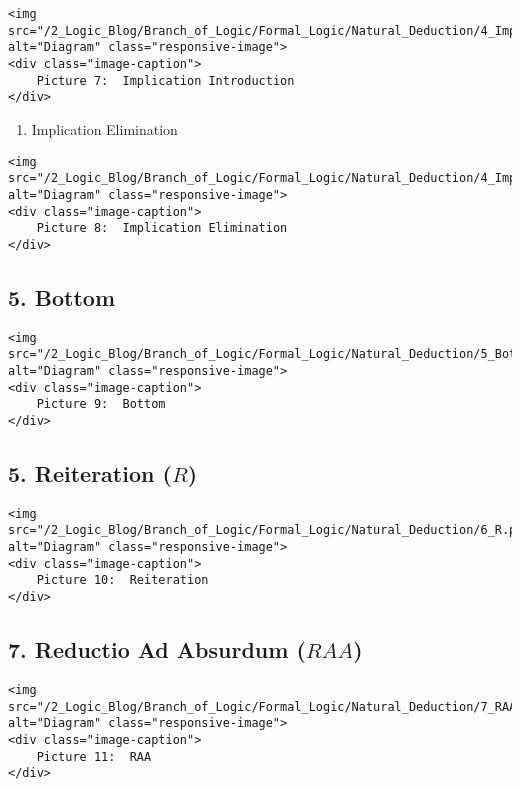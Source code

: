 \begin{verbatim}
<img src="/2_Logic_Blog/Branch_of_Logic/Formal_Logic/Natural_Deduction/4_Imp_Intro.png" alt="Diagram" class="responsive-image">
<div class="image-caption">
    Picture 7:  Implication Introduction
</div>
\end{verbatim}

\begin{enumerate}
\def\labelenumi{\alph{enumi}.}
\setcounter{enumi}{1}
\tightlist
\item
  Implication Elimination
\end{enumerate}

\begin{verbatim}
<img src="/2_Logic_Blog/Branch_of_Logic/Formal_Logic/Natural_Deduction/4_Imp_Elim.png" alt="Diagram" class="responsive-image">
<div class="image-caption">
    Picture 8:  Implication Elimination
</div>
\end{verbatim}

\subsection{5. Bottom}\label{bottom}

\begin{verbatim}
<img src="/2_Logic_Blog/Branch_of_Logic/Formal_Logic/Natural_Deduction/5_Bot.png" alt="Diagram" class="responsive-image">
<div class="image-caption">
    Picture 9:  Bottom
</div>
\end{verbatim}

\subsection{\texorpdfstring{5. Reiteration
(\(R\))}{5. Reiteration (R)}}\label{reiteration-r}

\begin{verbatim}
<img src="/2_Logic_Blog/Branch_of_Logic/Formal_Logic/Natural_Deduction/6_R.png" alt="Diagram" class="responsive-image">
<div class="image-caption">
    Picture 10:  Reiteration
</div>
\end{verbatim}

\subsection{\texorpdfstring{7. Reductio Ad Absurdum
(\(RAA\))}{7. Reductio Ad Absurdum (RAA)}}\label{reductio-ad-absurdum-raa}

\begin{verbatim}
<img src="/2_Logic_Blog/Branch_of_Logic/Formal_Logic/Natural_Deduction/7_RAA.png" alt="Diagram" class="responsive-image">
<div class="image-caption">
    Picture 11:  RAA
</div>
\end{verbatim}

